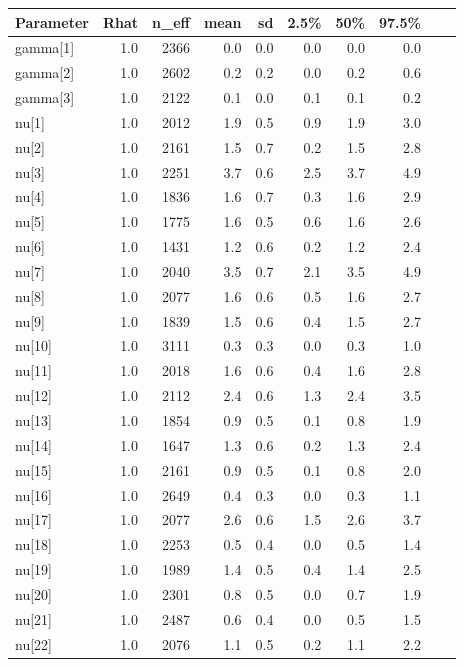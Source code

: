 \begin{longtable}{lrrrrrrr p{} | p{} |} 
  \hline
Parameter & Rhat & n\_eff & mean & sd & 2.5\% & 50\% & 97.5\% \\ 
  \hline
gamma[1] & 1.0 & 2366 & 0.0 & 0.0 & 0.0 & 0.0 & 0.0 \\ 
  gamma[2] & 1.0 & 2602 & 0.2 & 0.2 & 0.0 & 0.2 & 0.6 \\ 
  gamma[3] & 1.0 & 2122 & 0.1 & 0.0 & 0.1 & 0.1 & 0.2 \\ 
  nu[1] & 1.0 & 2012 & 1.9 & 0.5 & 0.9 & 1.9 & 3.0 \\ 
  nu[2] & 1.0 & 2161 & 1.5 & 0.7 & 0.2 & 1.5 & 2.8 \\ 
  nu[3] & 1.0 & 2251 & 3.7 & 0.6 & 2.5 & 3.7 & 4.9 \\ 
  nu[4] & 1.0 & 1836 & 1.6 & 0.7 & 0.3 & 1.6 & 2.9 \\ 
  nu[5] & 1.0 & 1775 & 1.6 & 0.5 & 0.6 & 1.6 & 2.6 \\ 
  nu[6] & 1.0 & 1431 & 1.2 & 0.6 & 0.2 & 1.2 & 2.4 \\ 
  nu[7] & 1.0 & 2040 & 3.5 & 0.7 & 2.1 & 3.5 & 4.9 \\ 
  nu[8] & 1.0 & 2077 & 1.6 & 0.6 & 0.5 & 1.6 & 2.7 \\ 
  nu[9] & 1.0 & 1839 & 1.5 & 0.6 & 0.4 & 1.5 & 2.7 \\ 
  nu[10] & 1.0 & 3111 & 0.3 & 0.3 & 0.0 & 0.3 & 1.0 \\ 
  nu[11] & 1.0 & 2018 & 1.6 & 0.6 & 0.4 & 1.6 & 2.8 \\ 
  nu[12] & 1.0 & 2112 & 2.4 & 0.6 & 1.3 & 2.4 & 3.5 \\ 
  nu[13] & 1.0 & 1854 & 0.9 & 0.5 & 0.1 & 0.8 & 1.9 \\ 
  nu[14] & 1.0 & 1647 & 1.3 & 0.6 & 0.2 & 1.3 & 2.4 \\ 
  nu[15] & 1.0 & 2161 & 0.9 & 0.5 & 0.1 & 0.8 & 2.0 \\ 
  nu[16] & 1.0 & 2649 & 0.4 & 0.3 & 0.0 & 0.3 & 1.1 \\ 
  nu[17] & 1.0 & 2077 & 2.6 & 0.6 & 1.5 & 2.6 & 3.7 \\ 
  nu[18] & 1.0 & 2253 & 0.5 & 0.4 & 0.0 & 0.5 & 1.4 \\ 
  nu[19] & 1.0 & 1989 & 1.4 & 0.5 & 0.4 & 1.4 & 2.5 \\ 
  nu[20] & 1.0 & 2301 & 0.8 & 0.5 & 0.0 & 0.7 & 1.9 \\ 
  nu[21] & 1.0 & 2487 & 0.6 & 0.4 & 0.0 & 0.5 & 1.5 \\ 
  nu[22] & 1.0 & 2076 & 1.1 & 0.5 & 0.2 & 1.1 & 2.2 \\ 

\end{longtable}
